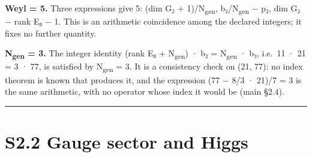 \documentclass[11pt,a4paper]{article}
\begin{document}
\textbf{Weyl = 5.} Three expressions give 5: (dim G₂ + 1)/N\textsubscript{gen}, b₂/N\textsubscript{gen} − p₂, dim G₂ − rank E₈ − 1. This is an arithmetic coincidence among the declared integers; it fixes no further quantity.

\textbf{N\textsubscript{gen} = 3.} The integer identity (rank E₈ + N\textsubscript{gen}) · b₂ = N\textsubscript{gen} · b₃, i.e.~11 · 21 = 3 · 77, is satisfied by N\textsubscript{gen} = 3. It is a consistency check on (21, 77): no index theorem is known that produces it, and the expression (77 − 8/3 · 21)/7 = 3 is the same arithmetic, with no operator whose index it would be (main §2.4).

\begin{center}\rule{\linewidth}{0.5pt}\end{center}

\section{S2.2 Gauge sector and Higgs}\label{s2.2-gauge-sector-and-higgs}
\end{document}
